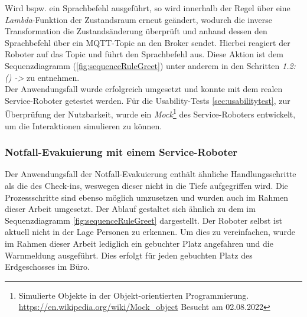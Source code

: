         Wird bspw. ein Sprachbefehl ausgeführt, so wird innerhalb der Regel über eine \textit{Lambda}-Funktion der Zustandsraum erneut geändert, wodurch die inverse Transformation 
        die Zustandsänderung überprüft und anhand dessen den Sprachbefehl über ein \acs{MQTT}-Topic an den Broker sendet. Hierbei reagiert der Roboter auf das Topic und führt 
        den Sprachbefehl aus. Diese Aktion ist dem Sequenzdiagramm (\ref{fig:sequenceRuleGreet}) unter anderem in den Schritten \textit{1.2:() ->} zu entnehmen. 
        \\
        Der Anwendungsfall wurde erfolgreich umgesetzt und konnte mit dem realen Service-Roboter getestet werden. Für die 
        Usability-Tests \ref{sec:usabilitytest}, zur Überprüfung der Nutzbarkeit, wurde ein \textit{Mock}\footnote{Simulierte Objekte in der Objekt-orientierten Programmierung. \url{https://en.wikipedia.org/wiki/Mock_object} Besucht am 02.08.2022} 
        des Service-Roboters entwickelt, um die Interaktionen simulieren zu können.
    
    \subsubsection*{Notfall-Evakuierung mit einem Service-Roboter}
        Der Anwendungsfall der Notfall-Evakuierung enthält ähnliche Handlungsschritte als die des Check-ins, weswegen dieser nicht in die 
        Tiefe aufgegriffen wird. Die Prozessschritte sind ebenso möglich umzusetzen und wurden auch im Rahmen dieser 
        Arbeit umgesetzt. Der Ablauf gestaltet sich ähnlich zu dem im Sequenzdiagramm \ref{fig:sequenceRuleGreet} dargestellt. 
        Der Roboter selbst ist aktuell nicht in der Lage Personen zu erkennen. Um dies zu vereinfachen, wurde im Rahmen dieser Arbeit 
        lediglich ein gebuchter Platz angefahren und die Warnmeldung ausgeführt. Dies erfolgt für jeden gebuchten Platz des Erdgeschosses 
        im Büro.
        
